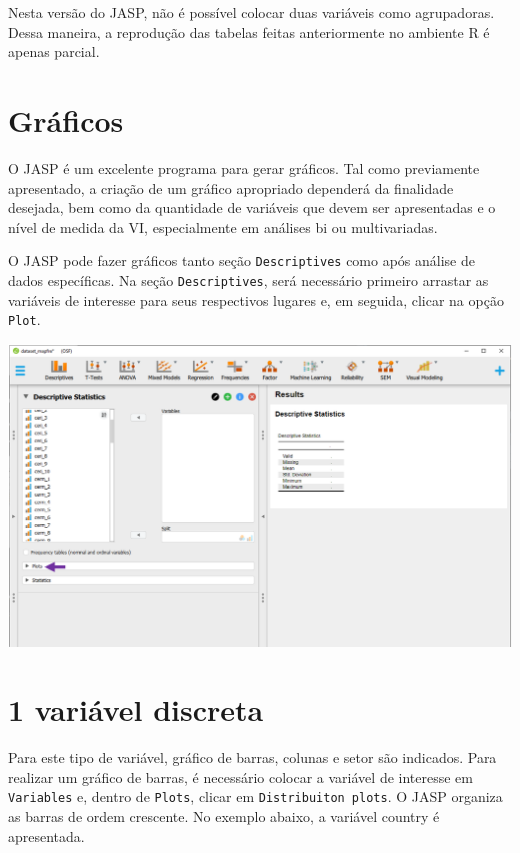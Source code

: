 \documentclass[
]{book}
\begin{document}
Nesta versão do JASP, não é possível colocar duas variáveis como
agrupadoras. Dessa maneira, a reprodução das tabelas feitas
anteriormente no ambiente R é apenas parcial.

\hypertarget{gruxe1ficos-2}{%
\section{Gráficos}\label{gruxe1ficos-2}}

O JASP é um excelente programa para gerar gráficos. Tal como previamente
apresentado, a criação de um gráfico apropriado dependerá da finalidade
desejada, bem como da quantidade de variáveis que devem ser apresentadas
e o nível de medida da VI, especialmente em análises bi ou
multivariadas.

O JASP pode fazer gráficos tanto seção \texttt{Descriptives} como após
análise de dados específicas. Na seção \texttt{Descriptives}, será
necessário primeiro arrastar as variáveis de interesse para seus
respectivos lugares e, em seguida, clicar na opção \texttt{Plot}.

\includegraphics{./img/cap_desc_jasp_graficos.png}

\hypertarget{variuxe1vel-discreta-1}{%
\section{1 variável discreta}\label{variuxe1vel-discreta-1}}

Para este tipo de variável, gráfico de barras, colunas e setor são
indicados. Para realizar um gráfico de barras, é necessário colocar a
variável de interesse em \texttt{Variables} e, dentro de \texttt{Plots},
clicar em \texttt{Distribuiton\ plots}. O JASP organiza as barras de
ordem crescente. No exemplo abaixo, a variável country é apresentada.
\end{document}
